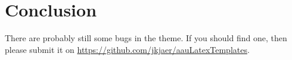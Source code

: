 \chapter{Conclusion}\label{ch:conclusion}
There are probably still some bugs in the theme. If you should find one, then please submit it on \url{https://github.com/jkjaer/aauLatexTemplates}.
